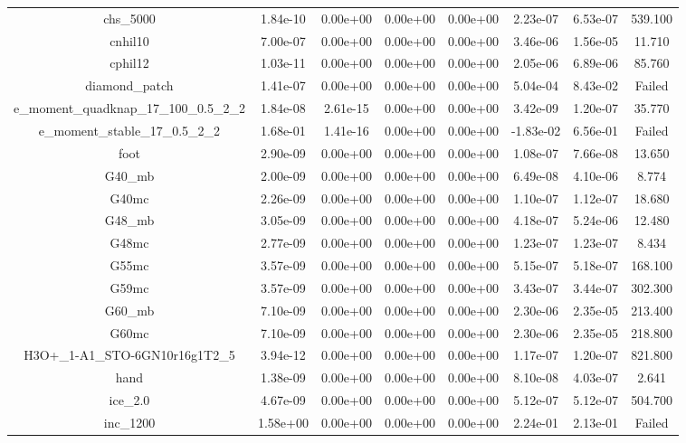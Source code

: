 {{\begin{table}[h]
\begin{center}
{\begin{tabular}{cccccccc}
            chs\_5000 & 1.84e-10 & 0.00e+00 & 0.00e+00 & 0.00e+00 & 2.23e-07 & 6.53e-07 & 539.100 \\ 
             cnhil10 & 7.00e-07 & 0.00e+00 & 0.00e+00 & 0.00e+00 & 3.46e-06 & 1.56e-05 & 11.710 \\ 
             cphil12 & 1.03e-11 & 0.00e+00 & 0.00e+00 & 0.00e+00 & 2.05e-06 & 6.89e-06 & 85.760 \\ 
       diamond\_patch & 1.41e-07 & 0.00e+00 & 0.00e+00 & 0.00e+00 & 5.04e-04 & 8.43e-02 & Failed \\ 
e\_moment\_quadknap\_17\_100\_0.5\_2\_2 & 1.84e-08 & 2.61e-15 & 0.00e+00 & 0.00e+00 & 3.42e-09 & 1.20e-07 & 35.770 \\ 
e\_moment\_stable\_17\_0.5\_2\_2 & 1.68e-01 & 1.41e-16 & 0.00e+00 & 0.00e+00 & -1.83e-02 & 6.56e-01 & Failed \\ 
                foot & 2.90e-09 & 0.00e+00 & 0.00e+00 & 0.00e+00 & 1.08e-07 & 7.66e-08 & 13.650 \\ 
              G40\_mb & 2.00e-09 & 0.00e+00 & 0.00e+00 & 0.00e+00 & 6.49e-08 & 4.10e-06 & 8.774 \\ 
               G40mc & 2.26e-09 & 0.00e+00 & 0.00e+00 & 0.00e+00 & 1.10e-07 & 1.12e-07 & 18.680 \\ 
              G48\_mb & 3.05e-09 & 0.00e+00 & 0.00e+00 & 0.00e+00 & 4.18e-07 & 5.24e-06 & 12.480 \\ 
               G48mc & 2.77e-09 & 0.00e+00 & 0.00e+00 & 0.00e+00 & 1.23e-07 & 1.23e-07 & 8.434 \\ 
               G55mc & 3.57e-09 & 0.00e+00 & 0.00e+00 & 0.00e+00 & 5.15e-07 & 5.18e-07 & 168.100 \\ 
               G59mc & 3.57e-09 & 0.00e+00 & 0.00e+00 & 0.00e+00 & 3.43e-07 & 3.44e-07 & 302.300 \\ 
              G60\_mb & 7.10e-09 & 0.00e+00 & 0.00e+00 & 0.00e+00 & 2.30e-06 & 2.35e-05 & 213.400 \\ 
               G60mc & 7.10e-09 & 0.00e+00 & 0.00e+00 & 0.00e+00 & 2.30e-06 & 2.35e-05 & 218.800 \\ 
H3O+\_1-A1\_STO-6GN10r16g1T2\_5 & 3.94e-12 & 0.00e+00 & 0.00e+00 & 0.00e+00 & 1.17e-07 & 1.20e-07 & 821.800 \\ 
                hand & 1.38e-09 & 0.00e+00 & 0.00e+00 & 0.00e+00 & 8.10e-08 & 4.03e-07 & 2.641 \\ 
             ice\_2.0 & 4.67e-09 & 0.00e+00 & 0.00e+00 & 0.00e+00 & 5.12e-07 & 5.12e-07 & 504.700 \\ 
            inc\_1200 & 1.58e+00 & 0.00e+00 & 0.00e+00 & 0.00e+00 & 2.24e-01 & 2.13e-01 & Failed \\ 

\end{tabular}}
\end{center}
\end{table}}}

